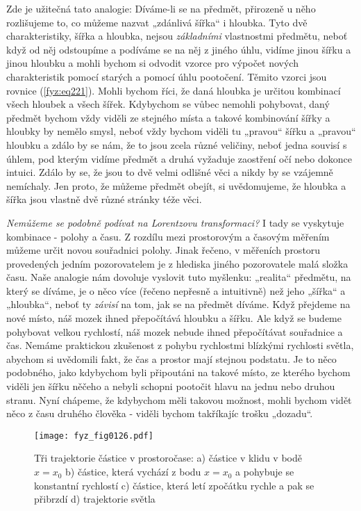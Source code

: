     Zde je užitečná tato analogie: Díváme-li se na předmět, přirozeně u něho rozlišujeme to, co
    můžeme nazvat „zdánlivá šířka“ i hloubka. Tyto dvě charakteristiky, šířka a hloubka, nejsou
    \emph{základními} vlastnostmi předmětu, neboť když od něj odstoupíme a podíváme se na něj z
    jiného úhlu, vidíme jinou šířku a jinou hloubku a mohli bychom si odvodit vzorce pro výpočet
    nových charakteristik pomocí starých a pomocí úhlu pootočení. Těmito vzorci jsou rovnice
    (\ref{fyz:eq221}). Mohli bychom říci, že daná hloubka je určitou kombinací všech hloubek a všech
    šířek. Kdybychom se vůbec nemohli pohybovat, daný předmět bychom vždy viděli ze stejného místa a
    takové kombinování šířky a hloubky by nemělo smysl, neboť vždy bychom viděli tu „pravou“ šířku a
    „pravou“ hloubku a zdálo by se nám, že to jsou zcela různé veličiny, neboť jedna souvisí s
    úhlem, pod kterým vidíme předmět a druhá vyžaduje zaostření očí nebo dokonce intuici. Zdálo by
    se, že jsou to dvě velmi odlišné věci a nikdy by se vzájemně nemíchaly. Jen proto, že můžeme
    předmět obejít, si uvědomujeme, že hloubka a šířka jsou vlastně dvě různé stránky téže věci.
     
    \emph{Nemůžeme se podobně podívat na Lorentzovu transformaci?} I tady se vyskytuje kombinace - 
    polohy a času. Z rozdílu mezi prostorovým a časovým měřením můžeme určit novou souřadnici 
    polohy. Jinak řečeno, v měřeních prostoru provedených jedním pozorovatelem je z hlediska jiného 
    pozorovatele malá složka času. Naše analogie nám dovoluje vyslovit tuto myšlenku: „realita“ 
    předmětu, na který se díváme, je o něco více (řečeno nepřesně a intuitivně) než jeho „šířka“ a 
    „hloubka“, neboť ty \emph{závisí} na tom, jak se na předmět díváme. Když přejdeme na nové 
    místo, náš mozek ihned přepočítává hloubku a šířku. Ale když se budeme pohybovat velkou 
    rychlostí, náš mozek nebude ihned přepočítávat souřadnice a čas. Nemáme praktickou zkušenost z 
    pohybu rychlostmi blízkými rychlosti světla, abychom si uvědomili fakt, že čas a prostor mají 
    stejnou podstatu. Je to něco podobného, jako kdybychom byli připoutáni na takové místo, ze 
    kterého bychom viděli jen šířku něčeho a nebyli schopni pootočit hlavu na jednu nebo druhou 
    stranu. Nyní chápeme, že kdybychom měli takovou možnost, mohli bychom vidět něco z času druhého 
    člověka - viděli bychom takříkajíc trošku „dozadu“.

    \begin{figure}[ht!]  %
      \centering
      \texttt{[image: fyz\_fig0126.pdf]}
      \caption{Tři trajektorie částice v prostoročase: a) částice v klidu v bodě \(x = x_0\)
               b) částice, která vychází z bodu \(x = x_0\) a pohybuje se konstantní rychlostí
               c) částice, která letí zpočátku rychle a pak se přibrzdí d) trajektorie světla 
               \cite[s.~238]{Feynman01}}
      \label{fyz:fig0126}
    \end{figure}
    
